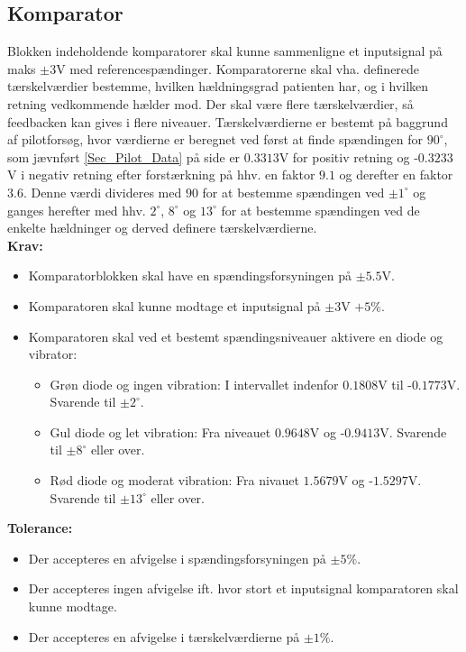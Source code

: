 \subsection{Komparator}\label{KomparatorAfs} 
Blokken indeholdende komparatorer skal kunne sammenligne et inputsignal på maks $\pm3$V med referencespændinger. Komparatorerne skal vha. definerede tærskelværdier bestemme, hvilken hældningsgrad patienten har, og i hvilken retning vedkommende hælder mod. Der skal være flere tærskelværdier, så feedbacken kan gives i flere niveauer. Tærskelværdierne er bestemt på baggrund af pilotforsøg, hvor værdierne er beregnet ved først at finde spændingen for $90^{\circ}$, som jævnført \ref{Sec_Pilot_Data} på side \pageref{Sec_Pilot_Data} er $0.3313$V for positiv retning og -$0.3233$V i negativ retning efter forstærkning på hhv. en faktor $9.1$ og derefter en faktor $3.6$. Denne værdi divideres med $90$ for at bestemme spændingen ved $\pm1^{\circ}$ og ganges herefter med hhv. $2^{\circ}$,  $8^{\circ}$ og $13^{\circ}$ for at bestemme spændingen ved de enkelte hældninger og derved definere tærskelværdierne.\\
\textbf{Krav:} 
\begin{itemize}
	\item Komparatorblokken skal have en spændingsforsyningen på $\pm5.5$V.
	\item Komparatoren skal kunne modtage et inputsignal på $\pm3$V $+5\%$.
	\item Komparatoren skal ved et bestemt spændingsniveauer aktivere en diode og vibrator:
	\begin{itemize}
		\item Grøn diode og ingen vibration: I intervallet indenfor $0.1808$V til -$0.1773$V. Svarende til $\pm2^{\circ}$.
		\item Gul diode og let vibration: Fra niveauet $0.9648$V og -$0.9413$V. Svarende til $\pm 8^{\circ}$ eller over.
		\item Rød diode og moderat vibration: Fra nivauet $1.5679$V og -$1.5297$V. Svarende til $\pm13^{\circ}$ eller over.
	\end{itemize}
\end{itemize}
\textbf{Tolerance:}
\begin{itemize}
	\item Der accepteres en afvigelse i spændingsforsyningen på $\pm5\%$.
	\item Der accepteres ingen afvigelse ift. hvor stort et inputsignal komparatoren skal kunne modtage.
	\item Der accepteres en afvigelse i tærskelværdierne på $\pm1\%$.
\end{itemize}
